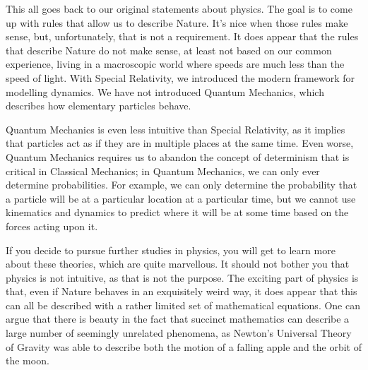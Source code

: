 This all goes back to our original statements about physics. The goal is to come up with rules that allow us to describe Nature. It's nice when those rules make sense, but, unfortunately, that is not a requirement. It does appear that the rules that describe Nature do not make sense, at least not based on our common experience, living in a macroscopic world where speeds are much less than the speed of light. With Special Relativity, we introduced the modern framework for modelling dynamics. We have not introduced Quantum Mechanics, which describes how elementary particles behave.

Quantum Mechanics is even less intuitive than Special Relativity, as it implies that particles act as if they are in multiple places at the same time. Even worse, Quantum Mechanics requires us to abandon the concept of determinism that is critical in Classical Mechanics; in Quantum Mechanics, we can only ever determine probabilities. For example, we can only determine the probability that a particle will be at a particular location at a particular time, but we cannot use kinematics and dynamics to predict where it will be at some time based on the forces acting upon it.

If you decide to pursue further studies in physics, you will get to learn more about these theories, which are quite marvellous. It should not bother you that physics is not intuitive, as that is not the purpose. The exciting part of physics is that, even if Nature behaves in an exquisitely weird way, it does appear that this can all be described with a rather limited set of mathematical equations. One can argue that there is beauty in the fact that succinct mathematics can describe a large number of seemingly unrelated phenomena, as Newton's Universal Theory of Gravity was able to describe both the motion of a falling apple and the orbit of the moon.

\newpage
